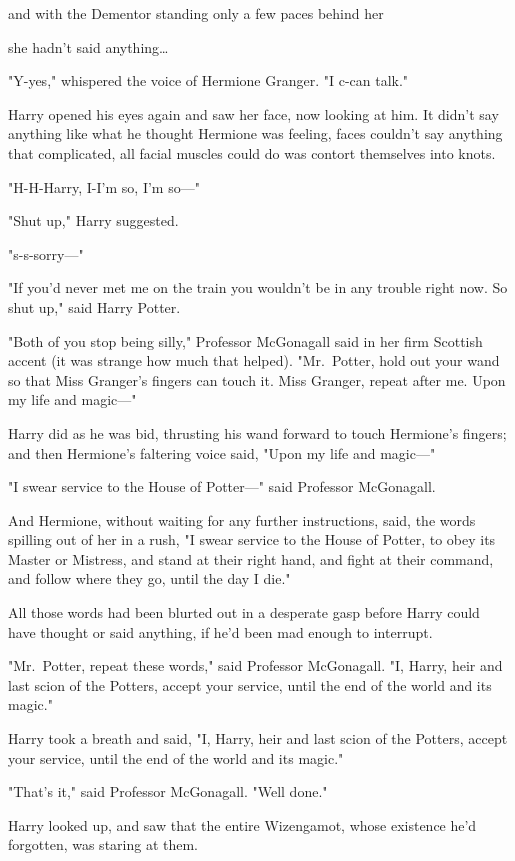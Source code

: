 and with the Dementor standing only a few paces behind her

she hadn't said anything{\ldots}

"Y-yes," whispered the voice of Hermione Granger. "I c-can talk."

Harry opened his eyes again and saw her face, now looking at him. It didn't say 
anything like what he thought Hermione was feeling, faces couldn't say anything 
that complicated, all facial muscles could do was contort themselves into knots.

"H-H-Harry, I-I'm so, I'm so---"

"Shut up," Harry suggested.

"s-s-sorry---"

"If you'd never met me on the train you wouldn't be in any trouble right now. 
So shut up," said Harry Potter.

"Both of you stop being silly," Professor McGonagall said in her firm Scottish 
accent (it was strange how much that helped). "Mr.~Potter, hold out your wand 
so that Miss Granger's fingers can touch it. Miss Granger, repeat after me. 
Upon my life and magic---"

Harry did as he was bid, thrusting his wand forward to touch Hermione's 
fingers; and then Hermione's faltering voice said, "Upon my life and magic---"

"I swear service to the House of Potter---" said Professor McGonagall.

And Hermione, without waiting for any further instructions, said, the words 
spilling out of her in a rush, "I swear service to the House of Potter, to obey 
its Master or Mistress, and stand at their right hand, and fight at their 
command, and follow where they go, until the day I die."

All those words had been blurted out in a desperate gasp before Harry could 
have thought or said anything, if he'd been mad enough to interrupt.

"Mr.~Potter, repeat these words," said Professor McGonagall. "I, Harry, heir 
and last scion of the Potters, accept your service, until the end of the world 
and its magic."

Harry took a breath and said, "I, Harry, heir and last scion of the Potters, 
accept your service, until the end of the world and its magic."

"That's it," said Professor McGonagall. "Well done."

Harry looked up, and saw that the entire Wizengamot, whose existence he'd 
forgotten, was staring at them.

